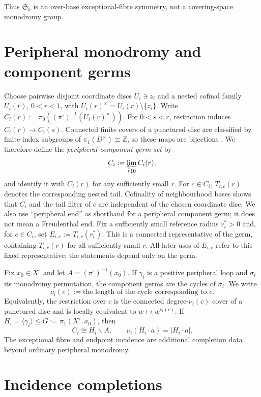 \documentclass[11pt]{article}
\theoremstyle{plain}
\theoremstyle{definition}
\begin{document}
Thus $\mathfrak S_k$ is an over-base exceptional-fibre symmetry, not a covering-space monodromy group.



\section{Peripheral monodromy and component germs}
\label{sec:peripheral-monodromy}

Choose pairwise disjoint coordinate discs $U_i\ni z_i$ and a nested cofinal family
$U_i(r)$, $0<r<1$, with $U_i(r)^\times=U_i(r)\setminus\{z_i\}$.  Write
$C_i(r):=\pi_0((\pi^\circ)^{-1}(U_i(r)^\times))$.  For $0<s<r$, restriction induces
$C_i(r)\to C_i(s)$.  Connected finite covers of a
punctured disc are classified by finite-index subgroups of
$\pi_1(D^\times)\cong\mathbb Z$, so these maps are bijections
\citep{Hatcher2002,Spanier1966}.  We therefore define the \emph{peripheral component-germ set}
by
\[
C_i:=\varprojlim_{r\downarrow0} C_i(r),
\]
and identify it with $C_i(r)$ for any sufficiently small $r$.  For $c\in C_i$,
$T_{i,c}(r)$ denotes the corresponding nested tail.  Cofinality of neighbourhood bases
shows that $C_i$ and the tail filter of $c$ are independent of the chosen coordinate disc.
We also use ``peripheral end'' as shorthand for a peripheral component germ; it does
not mean a Freudenthal end.  Fix a sufficiently small reference radius $r_i^*>0$ and,
for $c\in C_i$, set $E_{i,c}:=T_{i,c}(r_i^*)$.  This is a connected representative
of the germ, containing $T_{i,c}(r)$ for all sufficiently small $r$.  All later uses of
$E_{i,c}$ refer to this fixed representative; the statements depend only on the germ.

Fix $x_0\in X^\circ$ and let $A=(\pi^\circ)^{-1}(x_0)$.  If $\gamma_i$ is a positive
peripheral loop and $\sigma_i$ its monodromy permutation, the component germs are the
cycles of $\sigma_i$.  We write
\[
\nu_i(c):=\text{the length of the cycle corresponding to }c.
\]
Equivalently, the restriction over $c$ is the connected degree-$\nu_i(c)$ cover of a
punctured disc and is locally equivalent to $w\mapsto w^{\nu_i(c)}$.  If
$H_i=\langle\gamma_i\rangle\leq G:=\pi_1(X^\circ,x_0)$, then
\[
C_i\cong H_i\backslash A,
\qquad
\nu_i(H_i\cdot a)=|H_i\cdot a|.
\]
The exceptional fibre and endpoint incidence are additional completion data beyond
ordinary peripheral monodromy.

\section{Incidence completions}
\label{sec:incidence-completions}
\end{document}

